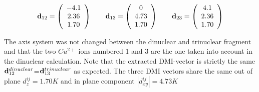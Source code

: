 \documentclass[10pt]{report}
\numberwithin{equation}{section}
\begin{document}
\[     \vb{d}_{12}=
\left( \begin{array}{c}
-4.1  \\
2.36  \\
1.70
\end{array} \right)
    \qquad
    \vb{d}_{13}=
    \left( \begin{array}{c}
    0  \\
    4.73  \\
    1.70
    \end{array} \right)
    \qquad    \vb{d}_{23}=
    \left( \begin{array}{c}
    4.1  \\
    2.36  \\
    1.70
    \end{array} \right)
    \]

The axis system was not changed between the dinuclear and trinuclear fragment and that the two $Cu^{2+}$ ions numbered 1 and 3 are the one taken into account in the dinuclear calculation.
Note that the extracted DMI-vector is strictly the same $\vb{d}_{12}^{dinuclear}$=$\vb{d}_{13}^{trinuclear}$ as expected.
The three DMI vectors share the same out of plane $d_z^{ij}=1.70K$ and in plane component $|d_{xy}^{ij}|=4.73K$
\end{document}
